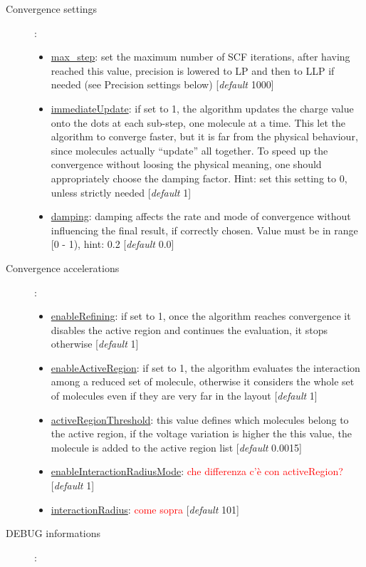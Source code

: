 \documentclass[a4paper,10pt]{article}
\begin{document}
\begin{description}
\begin{itemize}
	\end{itemize}
\item[Convergence settings]:
	\begin{itemize}
	\item \underline{max\_step}: set the maximum number of SCF iterations, after having reached this value, precision is lowered to LP and then to LLP if needed (see Precision settings below) [\textit{default} 1000] 
	\item \underline{immediateUpdate}: if set to 1, the algorithm updates the charge value onto the dots at each sub-step, one molecule at a time. This let the algorithm to converge faster, but it is far from the physical behaviour, since molecules actually \enquote{update} all together. To speed up the convergence without loosing the physical meaning, one should appropriately choose the damping factor. Hint: set this setting to 0, unless strictly needed [\textit{default} 1] 
	\item \underline{damping}: damping affects the rate and mode of convergence without influencing the final result, if correctly chosen. Value must be in range [0 - 1), hint: 0.2 [\textit{default} 0.0] 
	\end{itemize}
\item[Convergence accelerations]:
	\begin{itemize}
	\item \underline{enableRefining}: if set to 1, once the algorithm reaches convergence it disables the active region and continues the evaluation, it stops otherwise [\textit{default} 1] 
	\item \underline{enableActiveRegion}: if set to 1, the algorithm evaluates the interaction among a reduced set of molecule, otherwise it considers the whole set of molecules even if they are very far in the layout [\textit{default} 1] 
	\item \underline{activeRegionThreshold}: this value defines which molecules belong to the active region, if the voltage variation is higher  the this value, the molecule is added to the active region list [\textit{default} 0.0015] 
	\item \underline{enableInteractionRadiusMode}: \textcolor{red}{che differenza c'è con activeRegion?} [\textit{default} 1] 
	\item \underline{interactionRadius}: \textcolor{red}{come sopra} [\textit{default} 101] 
	\end{itemize}
\item[DEBUG informations]:
	\begin{itemize}

\end{itemize}
\end{description}
\end{document}
